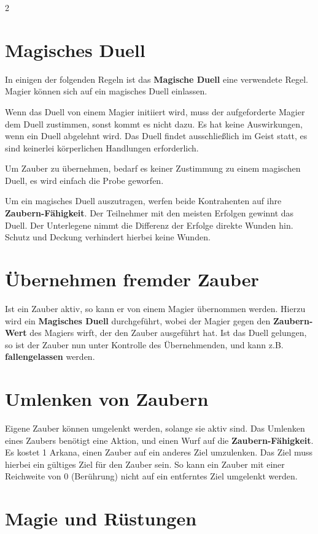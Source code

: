 \begin{multicols}{2}
\section{Magisches Duell}

In einigen der folgenden Regeln ist das \textbf{Magische Duell} eine verwendete Regel. Magier können sich auf ein magisches Duell einlassen.

Wenn das Duell von einem Magier initiiert wird, muss der aufgeforderte Magier dem Duell zustimmen, sonst kommt es nicht dazu. Es hat keine Auswirkungen, wenn ein Duell abgelehnt wird. Das Duell findet ausschließlich im Geist statt, es sind keinerlei körperlichen Handlungen erforderlich.

Um Zauber zu übernehmen, bedarf es keiner Zustimmung zu einem magischen Duell, es wird einfach die Probe geworfen.

Um ein magisches Duell auszutragen, werfen beide Kontrahenten auf ihre \textbf{Zaubern-Fähigkeit}. Der Teilnehmer mit den meisten Erfolgen gewinnt das Duell. Der Unterlegene nimmt die Differenz der Erfolge direkte Wunden hin. Schutz und Deckung verhindert hierbei keine Wunden.

\section{Übernehmen fremder Zauber}

Ist ein Zauber aktiv, so kann er von einem Magier übernommen werden. Hierzu wird ein \textbf{Magisches Duell} durchgeführt, wobei der Magier gegen den \textbf{Zaubern-Wert} des Magiers wirft, der den Zauber ausgeführt hat. Ist das Duell gelungen, so ist der Zauber nun unter Kontrolle des Übernehmenden, und kann z.B. \textbf{fallengelassen} werden.

\section{Umlenken von Zaubern}

Eigene Zauber können umgelenkt werden, solange sie aktiv sind. Das Umlenken eines Zaubers benötigt eine Aktion, und einen Wurf auf die \textbf{Zaubern-Fähigkeit}. Es kostet 1 Arkana, einen Zauber auf ein anderes Ziel umzulenken. Das Ziel muss hierbei ein gültiges Ziel für den Zauber sein. So kann ein Zauber mit einer Reichweite von 0 (Berührung) nicht auf ein entferntes Ziel umgelenkt werden.

\section{Magie und Rüstungen}


\end{multicols}
